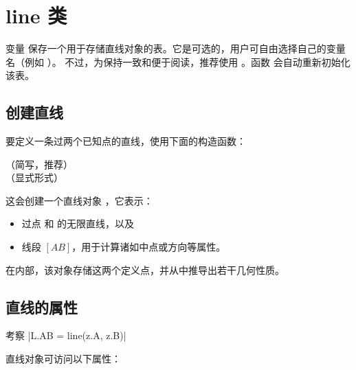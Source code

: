 \newpage
\section{line 类} %

变量  保存一个用于存储直线对象的表。它是可选的，用户可自由选择自己的变量名（例如 ）。
不过，为保持一致和便于阅读，推荐使用 。函数  会自动重新初始化该表。


\subsection{创建直线}
\label{sub:creating_a_line}

要定义一条过两个已知点的直线，使用下面的构造函数：

\begin{mybox}
   \hfill（简写，推荐）\\
   \hfill（显式形式）
\end{mybox}

这会创建一个直线对象 ，它表示：
\begin{itemize}
  \item 过点  和  的无限直线，以及
  \item 线段 $[AB]$，用于计算诸如中点或方向等属性。
\end{itemize}

\medskip

在内部，该对象存储这两个定义点，并从中推导出若干几何性质。

\subsection{直线的属性} %

考察 |L.AB = line(z.A, z.B)|

直线对象可访问以下属性：


